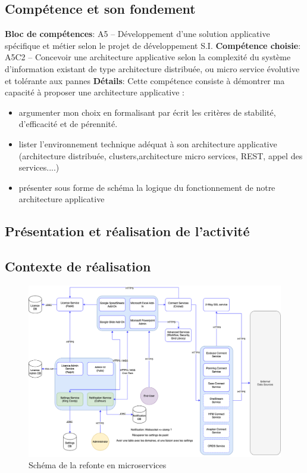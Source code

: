 \documentclass[a4paper, 11pt]{report}
\begin{document}
\subsection{Compétence et son fondement}
\textbf{Bloc de compétences}: A5 – Développement d’une solution applicative spécifique et métier selon le projet de développement S.I.
\newline
\textbf{Compétence choisie}: A5C2 – Concevoir une architecture applicative selon la complexité du système d’information existant de type architecture distribuée, ou micro service évolutive et tolérante aux pannes
\newline
\textbf{Détails}: Cette compétence consiste à démontrer ma capacité à proposer une architecture applicative :
\begin{itemize}
  \item argumenter mon choix en formalisant par écrit les critères de stabilité, d’efficacité et
de pérennité.
  \item lister l’environnement technique adéquat à son architecture applicative (architecture distribuée, clusters,architecture micro services, REST, appel des services....)
  \item présenter sous forme de schéma la logique du fonctionnement de notre architecture applicative
\end{itemize}
\subsection{Présentation et réalisation de l'activité}
\subsection{Contexte de réalisation}
  \begin{figure}[h]
      \centering
      \includegraphics[scale=0.40,center]{schemas/schema-qibates-v2.png}
      \caption{Schéma de la refonte en microservices}
  \end{figure}
\end{document}
